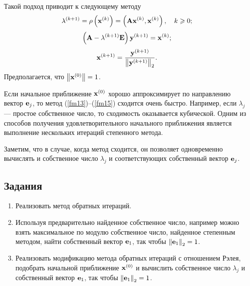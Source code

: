 \documentclass[12pt]{article}
\begin{document}
	Такой подход приводит к следующему методу
	\begin{equation}
		\lambda^{\left(k+1\right)}=\rho\left(\bold{x}^{\left(k\right)}\right)=\left(\bold{Ax}^{\left(k\right)},\bold{x}^{\left(k\right)}\right),\quad k\geqslant 0;\label{fm13}
	\end{equation}	
	\begin{equation}
		\left(\bold{A}-\lambda^{\left(k+1\right)}\bold{E}\right)\bold{y}^{\left(k+1\right)}=\bold{x}^{\left(k\right)};
	\end{equation}
	\begin{equation}
		\bold{x}^{\left(k+1\right)}=\frac{\bold{y}^{\left(k+1\right)}}{\left\|\bold{y}^{\left(k+1\right)}\right\|_2}.\label{fm15}
	\end{equation}
	Предполагается, что $\left\|\bold{x}^{\left(0\right)}\right\|=1$.
	
	Если начальное приближение $\bold{x}^{\left(0\right)}$ хорошо аппроксимирует по направлению вектор $\bold{e}_j$, то метод (\ref{fm13})--(\ref{fm15}) сходится очень быстро. Например, если $\lambda_j$ --- простое собственное число, то сходимость оказывается кубической. Одним из способов получения удовлетворительного начального приближения является выполнение нескольких итераций степенного метода.
	
	Заметим, что в случае, когда метод сходится, он позволяет одновременно вычислять и собственное число $\lambda_j$ и соответствующих собственный вектор $\bold{e}_j$.	
	
	\subsection*{Задания}
	
	\begin{enumerate}
		\item Реализовать метод обратных итераций.
		\item Используя предварительно найденное собственное число, например можно взять максимальное по модулю собственное число, найденное степенным методом, найти собственный вектор $\bold{e}_1$, так чтобы $\left\|\bold{e}_1\right\|_2=1$.
		\item Реализовать модификацию метода обратных итераций с отношением Рэлея, подобрать начальной приближение $\bold{x}^{\left(0\right)}$ и вычислить собственное число $\lambda_j$ и собственный вектор $\bold{e}_1$, так чтобы $\left\|\bold{e}_1\right\|_2=1$.
	\end{enumerate}
	
\end{document}
